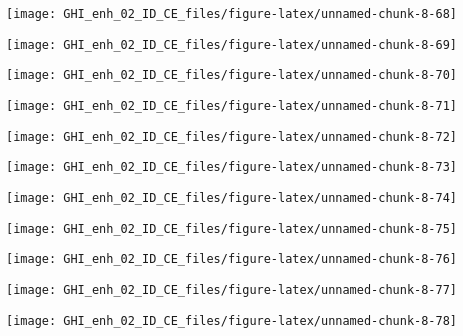\documentclass[
  10pt,
  a4paper,oneside]{article}
\begin{document}
\begin{center}\texttt{[image: GHI\_enh\_02\_ID\_CE\_files/figure-latex/unnamed-chunk-8-68]} \end{center}

\begin{center}\texttt{[image: GHI\_enh\_02\_ID\_CE\_files/figure-latex/unnamed-chunk-8-69]} \end{center}

\begin{center}\texttt{[image: GHI\_enh\_02\_ID\_CE\_files/figure-latex/unnamed-chunk-8-70]} \end{center}

\begin{center}\texttt{[image: GHI\_enh\_02\_ID\_CE\_files/figure-latex/unnamed-chunk-8-71]} \end{center}

\begin{center}\texttt{[image: GHI\_enh\_02\_ID\_CE\_files/figure-latex/unnamed-chunk-8-72]} \end{center}

\begin{center}\texttt{[image: GHI\_enh\_02\_ID\_CE\_files/figure-latex/unnamed-chunk-8-73]} \end{center}

\begin{center}\texttt{[image: GHI\_enh\_02\_ID\_CE\_files/figure-latex/unnamed-chunk-8-74]} \end{center}

\begin{center}\texttt{[image: GHI\_enh\_02\_ID\_CE\_files/figure-latex/unnamed-chunk-8-75]} \end{center}

\begin{center}\texttt{[image: GHI\_enh\_02\_ID\_CE\_files/figure-latex/unnamed-chunk-8-76]} \end{center}

\begin{center}\texttt{[image: GHI\_enh\_02\_ID\_CE\_files/figure-latex/unnamed-chunk-8-77]} \end{center}

\begin{center}\texttt{[image: GHI\_enh\_02\_ID\_CE\_files/figure-latex/unnamed-chunk-8-78]} \end{center}
\end{document}
